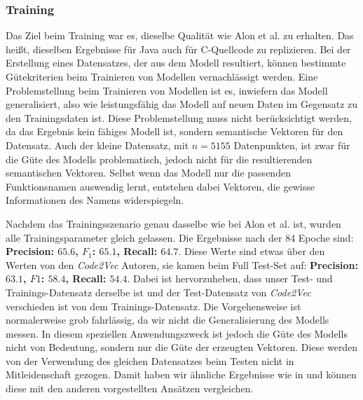 \documentclass[12pt,letterpaper,ngerman]{article}
\begin{document}
\subsubsection{Training}
Das Ziel beim Training war es, dieselbe Qualität wie Alon et al. zu erhalten. 
Das heißt, dieselben Ergebnisse für Java auch für C-Quellcode zu replizieren.
Bei der Erstellung eines Datensatzes, der aus dem Modell resultiert, 
können bestimmte Gütekriterien beim Trainieren von Modellen vernachlässigt 
werden. Eine Problemstellung beim Trainieren von Modellen 
ist es, inwiefern das Modell generalisiert, also wie leistungsfähig das 
Modell auf neuen Daten im Gegensatz zu den Trainingsdaten ist.
Diese Problemstellung muss nicht berücksichtigt werden, da das Ergebnis kein 
fähiges Modell ist, sondern semantische Vektoren für den Datensatz. 
Auch der kleine Datensatz, mit $n = 5155 $ Datenpunkten, ist zwar für die 
Güte des Modells problematisch, jedoch nicht für die resultierenden 
semantischen Vektoren. Selbst wenn das Modell nur die passenden 
Funktionsnamen auswendig lernt, entstehen dabei Vektoren, die gewisse 
Informationen des Namens widerspiegeln.

\pagebreak

Nachdem das Trainingsszenario 
genau dasselbe wie bei Alon et al. ist, wurden alle
Trainingsparameter gleich 
gelassen. Die Ergebnisse nach der 84 Epoche sind: 
{\bf Precision: $65.6$, $F_1$: $65.1$,  Recall: $64.7$}. Diese Werte sind 
etwas über den Werten von den \textit{Code2Vec} Autoren, sie kamen beim 
Full Test-Set auf: {\bf Precision: $63.1$, $F1$: $58.4$,  Recall: $54.4$}. 
Dabei ist hervorzuheben, dass unser Test- und Trainings-Datensatz derselbe ist
und der Test-Datensatz von \textit{Code2Vec} verschieden ist von dem 
Trainings-Datensatz. Die Vorgehensweise ist normalerweise grob fahrlässig,
da wir nicht die Generalisierung des Modells messen. In diesem speziellen 
Anwendungszweck ist jedoch die Güte des Modells nicht von Bedeutung,
sondern nur die Güte der erzeugten Vektoren. Diese werden von der 
Verwendung des gleichen Datensatzes beim Testen nicht in
Mitleidenschaft gezogen. Damit haben wir ähnliche Ergebnisse wie in
\cite{code2vec} 
und können diese mit den anderen vorgestellten Ansätzen vergleichen.
\end{document}

